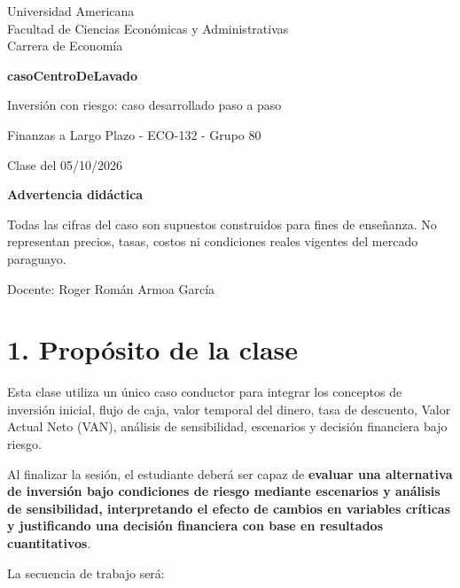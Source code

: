 \documentclass[11pt,a4paper]{article}
\begin{document}
\begin{titlepage}
\centering
\vspace*{1.6cm}
{\Large Universidad Americana\\[4pt] Facultad de Ciencias Económicas y Administrativas\\[4pt] Carrera de Economía\par}
\vspace{1.2cm}
{\Huge\bfseries casoCentroDeLavado\par}
\vspace{0.4cm}
{\LARGE Inversión con riesgo: caso desarrollado paso a paso\par}
\vspace{1.1cm}
{\large Finanzas a Largo Plazo - ECO-132 - Grupo 80\par}
\vspace{0.5cm}
{\large Clase del 05/10/2026\par}
\vfill
\begin{tcolorbox}[colback=softorange,colframe=darkorange,width=0.86\textwidth,arc=2mm]
\centering\textbf{Advertencia didáctica}\par
Todas las cifras del caso son supuestos construidos para fines de enseñanza. No representan precios, tasas, costos ni condiciones reales vigentes del mercado paraguayo.
\end{tcolorbox}
\vfill
{\large Docente: Roger Román Armoa García\par}
\end{titlepage}

\section*{1. Propósito de la clase}

Esta clase utiliza un único caso conductor para integrar los conceptos de inversión inicial, flujo de caja, valor temporal del dinero, tasa de descuento, Valor Actual Neto (VAN), análisis de sensibilidad, escenarios y decisión financiera bajo riesgo.

\begin{concepto}
Al finalizar la sesión, el estudiante deberá ser capaz de \textbf{evaluar una alternativa de inversión bajo condiciones de riesgo mediante escenarios y análisis de sensibilidad, interpretando el efecto de cambios en variables críticas y justificando una decisión financiera con base en resultados cuantitativos}.
\end{concepto}

La secuencia de trabajo será:
\end{document}
